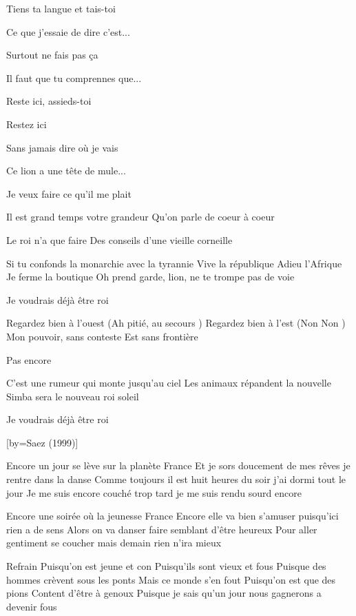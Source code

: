 \beginverse
Tiens ta langue et tais-toi
\endverse

\beginverse
Ce que j’essaie de dire c’est...
\endverse

\beginverse
Surtout ne fais pas ça \!
\endverse

\beginverse
Il faut que tu comprennes que...
\endverse

\beginverse
Reste ici, assieds-toi
\endverse

\beginverse
Restez ici
\endverse

\beginverse
Sans jamais dire où je vais
\endverse

\beginverse
Ce lion a une tête de mule...
\endverse

\beginverse
Je veux faire ce qu’il me plait
\endverse

\beginverse
Il est grand temps votre grandeur
Qu’on parle de coeur à coeur
\endverse

\beginverse
Le roi n’a que faire
Des conseils d’une vieille corneille
\endverse

\beginverse
Si tu confonds la monarchie avec la tyrannie
Vive la république
Adieu l’Afrique \!
Je ferme la boutique
Oh prend garde, lion, ne te trompe pas de voie
\endverse

\beginverse
Je voudrais déjà être roi \!
\endverse

\beginverse
Regardez bien à l’ouest (Ah pitié, au secours \!)
Regardez bien à l’est (Non \! Non \!)
Mon pouvoir, sans conteste
Est sans frontière
\endverse

\beginverse
Pas encore \!
\endverse

\beginverse
C’est une rumeur qui monte jusqu’au ciel
Les animaux répandent la nouvelle
Simba sera le nouveau roi soleil
\endverse

\beginverse
Je voudrais déjà être roi \! \\[3x]
\endverse

[by={Saez (1999)}]

\beginverse
Encore un jour se lève sur la planète France
Et je sors doucement de mes rêves je rentre dans la danse
Comme toujours il est huit heures du soir j'ai dormi tout le jour
Je me suis encore couché trop tard je me suis rendu sourd encore
\endverse

\beginverse
Encore une soirée où la jeunesse France
Encore elle va bien s'amuser puisqu'ici rien a de sens
Alors on va danser faire semblant d'être heureux
Pour aller gentiment se coucher mais demain rien n'ira mieux
\endverse

\beginverse
Refrain
Puisqu'on est jeune et con
Puisqu'ils sont vieux et fous
Puisque des hommes crèvent sous les ponts
Mais ce monde s'en fout
Puisqu'on est que des pions
Content d'être à genoux
Puisque je sais qu'un jour nous gagnerons a devenir fous
\endverse

